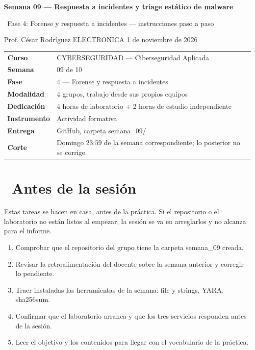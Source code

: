 \documentclass[11pt,a4paper]{article}
\newcommand{\iconoBanda}{microchip}
\newcommand{\bandaTitulo}[3][fondoOscuro]{%
  \begin{tcolorbox}[
    enhanced,
    colback=#1, colframe=#1,
    boxrule=0pt, arc=8pt, outer arc=8pt,
    width=\linewidth,
    top=18pt, bottom=6pt, left=14pt, right=14pt,
    borderline south={3.5pt}{0pt}{cyanNeon},
  ]
    \begin{minipage}[c]{0.07\linewidth}
      \centering
      \textcolor{cyanNeon}{\fontsize{30}{30}\selectfont\faIcon{\iconoBanda}}
    \end{minipage}%
    \hspace{8pt}%
    \begin{minipage}[c]{0.88\linewidth}
      {\fontsize{20}{24}\selectfont\bfseries\color{white}#2}\par\vspace{5pt}%
      \textcolor{cyanNeon!80!white}{\small\faIcon{angle-right}~#3}%
    \end{minipage}
    \vspace{4pt}
  \end{tcolorbox}%
  \vspace{8pt}%
}
\newcommand{\iconotexto}[2]{\textcolor{cyanNeon}{\faIcon{#1}}~#2}
\renewcommand{\iconoBanda}{shield-alt}
\begin{document}
\bandaTitulo[fondoOscuro]{Semana 09 --- Respuesta a incidentes y triage estático de malware}{Fase 4: Forense y respuesta a incidentes --- instrucciones paso a paso}

\begin{center}\small\color{grisTexto}Prof. César Rodríguez \textbar{} ELECTRONICA \textbar{} 1 de noviembre de 2026\end{center}

\begin{tabularx}{\linewidth}{@{}>{\raggedright\arraybackslash}p{4.6cm}X@{}}
\toprule
\textbf{Curso} & CYBERSEGURIDAD --- Ciberseguridad Aplicada \\
\textbf{Semana} & 09 de 10 \\
\textbf{Fase} & 4 --- Forense y respuesta a incidentes \\
\textbf{Modalidad} & 4 grupos, trabajo desde sus propios equipos \\
\textbf{Dedicación} & 4 horas de laboratorio + 2 horas de estudio independiente \\
\textbf{Instrumento} & Actividad formativa \\
\textbf{Entrega} & GitHub, carpeta semana\_09/ \\
\textbf{Corte} & Domingo 23:59 de la semana correspondiente; lo posterior no se corrige. \\
\bottomrule
\end{tabularx}

\section{\iconotexto{clock}{Antes de la sesión}}

Estas tareas se hacen en casa, antes de la práctica. Si el repositorio o el laboratorio no están listos al empezar, la sesión se va en arreglarlos y no alcanza para el informe.

\begin{enumerate}[leftmargin=1.4em,itemsep=2pt,topsep=3pt]
  \item Comprobar que el repositorio del grupo tiene la carpeta semana\_09 creada.
  \item Revisar la retroalimentación del docente sobre la semana anterior y corregir lo pendiente.
  \item Traer instaladas las herramientas de la semana: file y strings, YARA, sha256sum.
  \item Confirmar que el laboratorio arranca y que los tres servicios responden antes de la sesión.
  \item Leer el objetivo y los contenidos para llegar con el vocabulario de la práctica.
\end{enumerate}
\end{document}
